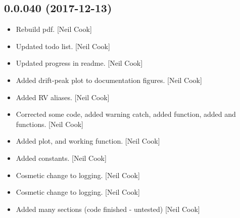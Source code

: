 \documentclass[a4paper,10pt,english]{report}
\begin{document}
\subsection{0.0.040 (2017-12-13)}
\label{\detokenize{misc/changelog:id512}}\begin{itemize}
\item {} 
Rebuild pdf. {[}Neil Cook{]}

\item {} 
Updated todo list. {[}Neil Cook{]}

\item {} 
Updated progress in readme. {[}Neil Cook{]}

\item {} 
Added drift-peak plot to documentation figures. {[}Neil Cook{]}

\item {} 
Added RV aliases. {[}Neil Cook{]}

\item {} 
Corrected some code, added warning catch, added  function,
added  and  functions. {[}Neil Cook{]}

\item {} 
Added  plot,  and working
function. {[}Neil Cook{]}

\item {} 
Added  constants. {[}Neil Cook{]}

\item {} 
Cosmetic change to logging. {[}Neil Cook{]}

\item {} 
Cosmetic change to logging. {[}Neil Cook{]}

\item {} 
Added many sections (code finished - untested) {[}Neil Cook{]}

\end{itemize}
\end{document}
